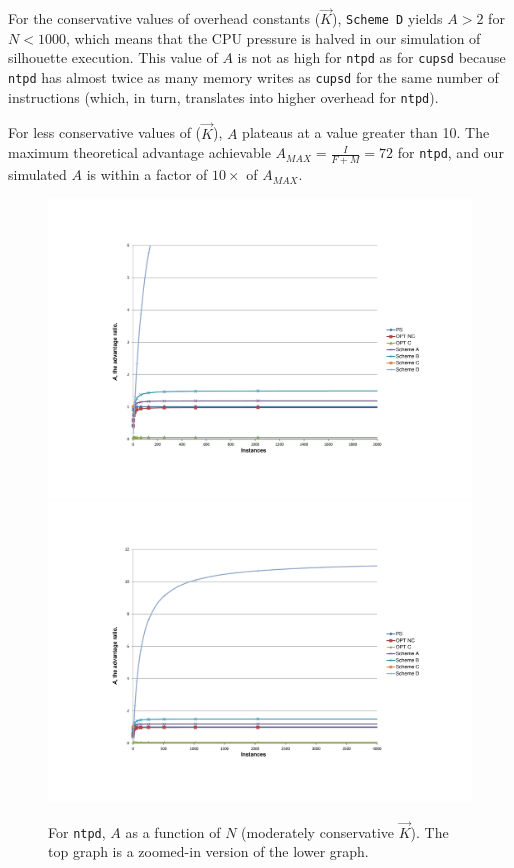 For the conservative values of overhead constants ($\vec K$),
\texttt{Scheme D} yields $A > 2$ for $N < 1000$,
which means that the CPU pressure is halved in our simulation of silhouette execution.
This value of $A$ is not as high for
\texttt{ntpd} as for \texttt{cupsd}
because \texttt{ntpd} has almost twice as many memory 
writes as \texttt{cupsd} for the same number of instructions 
(which, in turn, translates into higher overhead for \texttt{ntpd}).

For less conservative values of ($\vec K$), $A$ plateaus
at a value greater than 10. The maximum theoretical
advantage achievable $A_{MAX} = \frac{I}{F+M} = 72$ for 
\texttt{ntpd}, and our simulated $A$ is within a factor of $10\times$ 
of $A_{MAX}$.

\begin{figure}
  \centering
  \subfloat%
           {\includegraphics[scale=0.75, trim=5cm 3cm 0cm 4.5cm]{ntp-2.pdf} \label{ntp2}} \\
  \subfloat%
           {\includegraphics[scale=0.75, trim=5cm 3cm 0cm 3cm]{ntp-3.pdf} \label{ntp3}} 
  \caption[For \texttt{ntpd}, $A$ as a function of $N$ (moderately conservative $\vec K$)]%
          {For \texttt{ntpd}, $A$ as a function of $N$ (moderately conservative $\vec K$).
          The top graph is a zoomed-in version of the lower graph.}
  \label{ntp23}
\end{figure}

